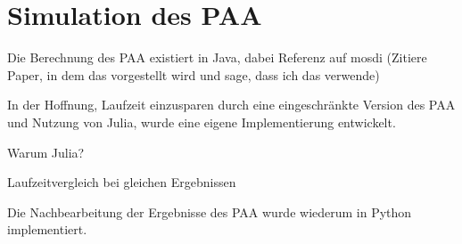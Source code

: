 

\section{Simulation des PAA}
Die Berechnung des PAA existiert in Java, dabei Referenz auf mosdi (Zitiere Paper, in dem das vorgestellt wird und sage, dass ich das verwende)

In der Hoffnung, Laufzeit einzusparen durch eine eingeschränkte Version des PAA und Nutzung von Julia, wurde eine eigene Implementierung entwickelt.


Warum Julia? 

Laufzeitvergleich bei gleichen Ergebnissen

Die Nachbearbeitung der Ergebnisse des PAA wurde wiederum in Python implementiert.


